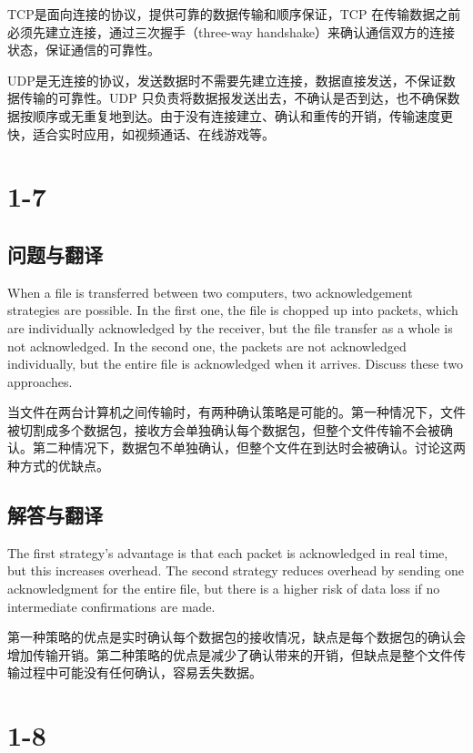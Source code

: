 TCP是面向连接的协议，提供可靠的数据传输和顺序保证，TCP 在传输数据之前必须先建立连接，通过三次握手（three-way handshake）来确认通信双方的连接状态，保证通信的可靠性。

UDP是无连接的协议，发送数据时不需要先建立连接，数据直接发送，不保证数据传输的可靠性。UDP 只负责将数据报发送出去，不确认是否到达，也不确保数据按顺序或无重复地到达。由于没有连接建立、确认和重传的开销，传输速度更快，适合实时应用，如视频通话、在线游戏等。

\section{1-7}

\subsection{问题与翻译}

When a file is transferred between two computers, two acknowledgement strategies are possible. In the first one, the file is chopped up into packets, which are individually acknowledged by the receiver, but the file transfer as a whole is not acknowledged. In the second one, the packets are not acknowledged individually, but the entire file is acknowledged when it arrives. Discuss these two approaches.

当文件在两台计算机之间传输时，有两种确认策略是可能的。第一种情况下，文件被切割成多个数据包，接收方会单独确认每个数据包，但整个文件传输不会被确认。第二种情况下，数据包不单独确认，但整个文件在到达时会被确认。讨论这两种方式的优缺点。

\subsection{解答与翻译}

The first strategy's advantage is that each packet is acknowledged in real time, but this increases overhead. The second strategy reduces overhead by sending one acknowledgment for the entire file, but there is a higher risk of data loss if no intermediate confirmations are made.

第一种策略的优点是实时确认每个数据包的接收情况，缺点是每个数据包的确认会增加传输开销。第二种策略的优点是减少了确认带来的开销，但缺点是整个文件传输过程中可能没有任何确认，容易丢失数据。

\section{1-8}

